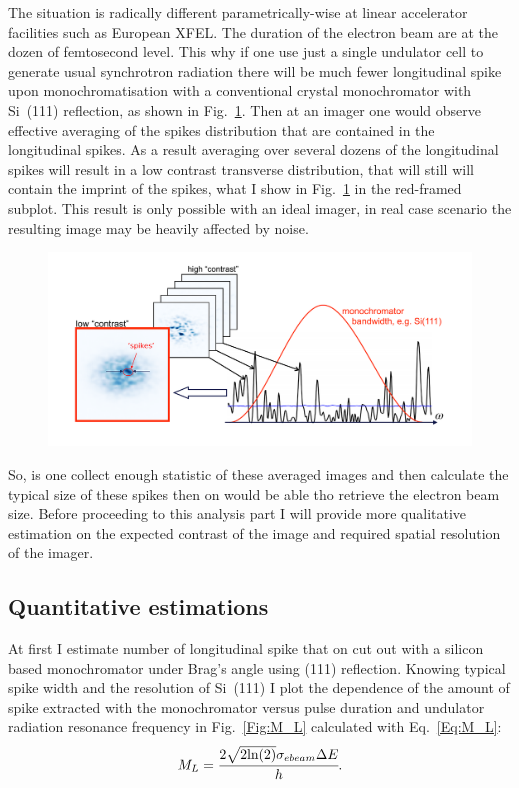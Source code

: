     The situation is radically different parametrically-wise at linear accelerator facilities such as European XFEL. The duration of the electron beam are at the dozen of femtosecond level. This why if one use just a single undulator cell to generate usual synchrotron radiation there will be much fewer longitudinal spike upon monochromatisation with a conventional crystal monochromator with Si~(111) reflection, as shown in Fig.~\ref{Fig:SR_spikes_few}. Then at an imager one would observe effective averaging of the spikes distribution that are contained in the longitudinal spikes. As a result averaging over several dozens of the longitudinal spikes will result in a low contrast transverse distribution, that will still will contain the imprint of the spikes, what I show in Fig.~\ref{Fig:SR_spikes_few} in the red-framed subplot. This result is only possible with an ideal imager, in real case scenario the resulting image may be heavily affected by noise.

    \begin{figure}[h!]
    	\centering
        \includegraphics[width=0.99\linewidth]{content/images/ebeam_size_with_SR/SR_spikes_few.pdf}
        \captionsetup{justification=centering}
        \caption{}
        \label{Fig:SR_spikes_few}
    \end{figure}

    So, is one collect enough statistic of these averaged images and then calculate the typical size of these spikes then on would be able tho retrieve the electron beam size. Before proceeding to this analysis part I will provide more qualitative estimation on the expected contrast of the image and required spatial resolution of the imager.
    
\subsection{Quantitative estimations}
    At first I estimate number of longitudinal spike that on cut out with a silicon based monochromator under Brag's angle using (111) reflection. Knowing typical spike width and the resolution of Si~(111) I plot the dependence of the amount of spike extracted with the monochromator versus pulse duration and undulator radiation resonance frequency in Fig.~\ref{Fig:M_L} calculated with Eq.~\ref{Eq:M_L}:
    \begin{align}
        M_L = \cfrac{2\sqrt{2 \textup{ln}(2)} \sigma_{ebeam} \Delta E}{h}.
        \label{Eq:M_L}
    \end{align}
    
